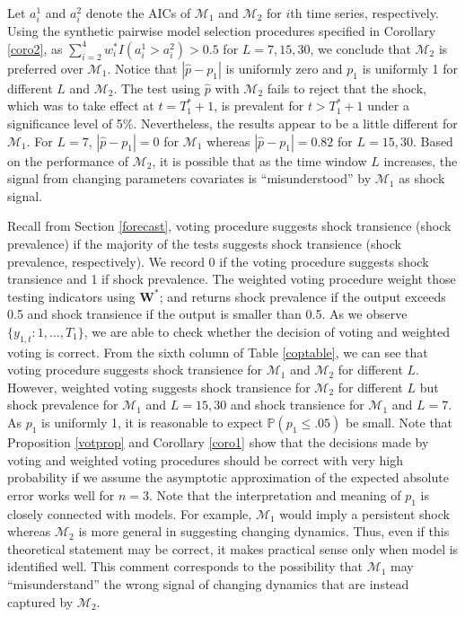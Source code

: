 \documentclass[11pt]{article}
\def\mbf#1{\mathbf{#1}} %
\def\mc#1{\mathcal{#1}} %
\def\mc#1{\mathcal{#1}}
\def\P{\mathbb{P}}
\theoremstyle{definition}
\begin{document}
Let $a_i^1$ and $a_i^2$ denote the AICs of $\mc{M}_1$ and $\mc{M}_2$ for $i$th time series, respectively. Using the synthetic pairwise model selection procedures specified in Corollary \ref{coro2}, as  $\sum_{i=2}^4 w_i^* I(a_i^1 > a_i^2)>0.5$ for $L = 7, 15, 30$, we conclude that $\mc{M}_2$ is preferred over $\mc{M}_1$.  Notice that $|\hat{p}-p_1|$ is uniformly zero and $p_1$ is uniformly 1 for different $L$ and $\mc{M}_2$. The test  using $\hat{p}$ with $\mc{M}_2$ fails to reject that  the shock, which was to take effect at $t=T_1^*+1$,  is prevalent for $t > T_1^*+1$ under a significance level of 5\%. Nevertheless, the results appear to be a little different for $\mc{M}_1$. For $L=7$, $|\hat{p}-p_1|=0$ for $\mc{M}_1$ whereas $|\hat{p}-p_1|=0.82$ for $L = 15, 30$. Based on the performance of $\mc{M}_2$, it is possible that as the time window $L$ increases, the signal from changing parameters covariates is ``misunderstood'' by $\mc{M}_1$ as shock signal. 



Recall from Section \ref{forecast}, voting procedure suggests shock transience (shock prevalence) if the majority of the tests  suggests shock transience (shock prevalence, respectively). We record 0 if the voting procedure suggests shock transience and 1 if shock prevalence. The weighted voting procedure weight those testing indicators using $\mbf{W}^*$; and returns shock prevalence if the output exceeds 0.5 and shock transience if the output is smaller than 0.5. As we observe $\{y_{1,t} \colon 1, \ldots, T_1\}$, we are able to check whether the decision of voting and weighted voting is correct. From the sixth column of Table \ref{coptable}, we can see that voting procedure suggests shock transience for $\mc{M}_1$ and $\mc{M}_2$ for different $L$. However, weighted voting suggests shock transience for $\mc{M}_2$ for different $L$ but shock prevalence for $\mc{M}_1$ and $L=15, 30$ and shock transience for $\mc{M}_1$ and $L = 7$. As $p_1$ is uniformly 1, it is reasonable to expect $\P(p_1\leq .05)$ be small. Note that Proposition \ref{votprop} and Corollary \ref{coro1} show that the decisions made by voting and weighted voting procedures should be correct with very high probability if we assume the asymptotic approximation of the expected absolute error works well for  $n = 3$. Note that the interpretation and meaning of $p_1$ is closely connected with models. For example, $\mc{M}_1$ would imply a persistent shock whereas $\mc{M}_2$ is more general in suggesting changing dynamics. Thus, even if  this theoretical statement  may be correct, it makes practical sense only when model is identified well. This comment corresponds to the possibility that $\mc{M}_1$ may ``misunderstand'' the wrong signal of changing dynamics that are instead captured by $\mc{M}_2$.
\end{document}
